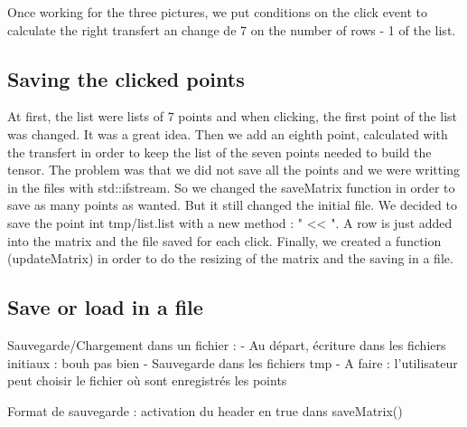 \documentclass{report}
\begin{document}
Once working for the three pictures, we put conditions on the click event to calculate the right transfert an change de 7 on the number of rows - 1 of the list. 

\subsection{Saving the clicked points}
At first, the list were lists of 7 points and when clicking, the first point of the list was changed. It was a great idea. 
Then we add an eighth point, calculated with the transfert in order to keep the list of the seven points needed to build the tensor. The problem was that we did not save all the points and we were writting in the files with std::ifstream. So we changed the saveMatrix function in order to save as many points as wanted. But it still changed the initial file. 
We decided to save the point int tmp/list.list with a new method : " << ". A row is just added into the matrix and the file saved for each click. 
Finally, we created a function (updateMatrix) in order to do the resizing of the matrix and the saving in a file. 

\subsection{Save or load in a file}
Sauvegarde/Chargement dans un fichier :
    - Au départ, écriture dans les fichiers initiaux : bouh pas bien
    - Sauvegarde dans les fichiers tmp
    - A faire : l’utilisateur peut choisir le fichier où sont enregistrés les points

Format de sauvegarde : activation du header en true dans saveMatrix()
\end{document}
